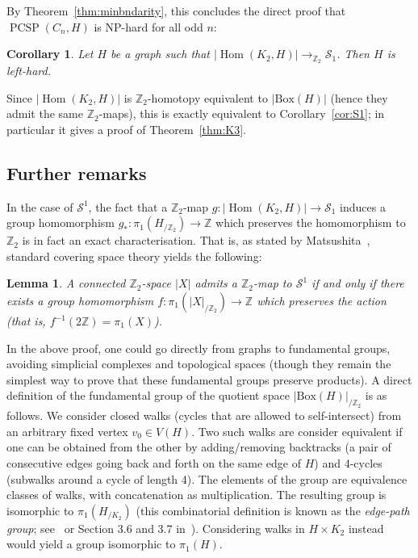 \documentclass[11pt,a4paper]{scrartcl}
\numberwithin{theorem}{section}
\newtheorem{lemma}[theorem]{Lemma}
\newtheorem{corollary}[theorem]{Corollary}
\theoremstyle{definition}
\newcommand{\ZZ}{\mathbb{Z}}
\DeclareMathOperator{\PCSP}{PCSP}
\newcommand\Sphere{\mathcal{S}}
\DeclareMathOperator{\Hom}{Hom}
\newcommand\BBox[1]{\left|\mathrm{Box}(#1)\right|}
\begin{document}
\noindent
By Theorem~\ref{thm:minbndarity}, this concludes the direct proof that $\PCSP(C_n,H)$ is NP-hard for all odd $n$:
\begin{corollary}
	Let $H$ be a graph such that $|\Hom(K_2,H)| \to_{\ZZ_2} \Sphere_1$.
	Then $H$ is left-hard.
\end{corollary}

\noindent
Since $|\Hom(K_2,H)|$ is $\ZZ_2$-homotopy equivalent to $\BBox{H}$ (hence they admit the same $\ZZ_2$-maps),
this is exactly equivalent to Corollary~\ref{cor:S1};
in particular it gives a proof of Theorem~\ref{thm:K3}.

\subsection*{Further remarks}
In the case of $\Sphere^1$, the fact that a $\ZZ_2$-map $g\colon|\Hom(K_2,H)|\to \Sphere_1$ induces a group homomorphism $g_* \colon \pi_1(H_{/\ZZ_2}) \to \ZZ$ which preserves the homomorphism to $\ZZ_2$ is in fact an exact characterisation.
That is, as stated by Matsushita~\cite{Matsushita17}, standard covering space theory yields the following:
\begin{lemma}
	A connected $\ZZ_2$-space $|X|$ admits a $\ZZ_2$-map to $\Sphere^1$ if and only if there exists a group homomorphism $f \colon \pi_1(|X|_{/\ZZ_2}) \to \ZZ$ which preserves the action (that is, $f^{-1}(2\ZZ) = \pi_1(X)$).
\end{lemma}

In the above proof, one could go directly from graphs to fundamental groups, avoiding simplicial complexes and topological spaces (though they remain the simplest way to prove that these fundamental groups preserve products).
A direct definition of the fundamental group of the quotient space $\BBox{H}_{/\ZZ_2}$ is as follows.
We consider closed walks (cycles that are allowed to self-intersect) from an arbitrary fixed vertex $v_0 \in V(H)$.
Two such walks are consider equivalent if one can be obtained from the other by adding/removing backtracks (a pair of consecutive edges going back and forth on the same edge of $H$) and 4-cycles (subwalks around a cycle of length 4).
The elements of the group are equivalence classes of walks, with concatenation as multiplication.
The resulting group is isomorphic to $\pi_1(H_{/K_2})$ (this combinatorial definition is known as the \emph{edge-path group}; see~\cite{Matsushita12} or Section 3.6 and 3.7 in~\cite{Spanier}).
Considering walks in $H \times K_2$ instead would yield a group isomorphic to $\pi_1(H)$.
\end{document}
